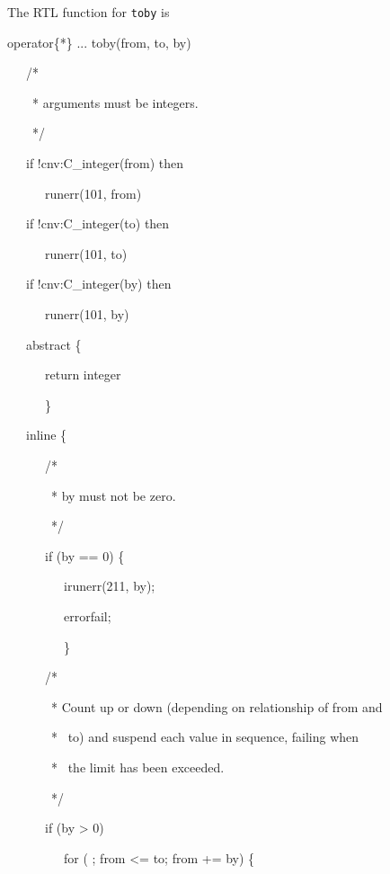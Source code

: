 The RTL function for \texttt{toby} is

{\ttfamily\mdseries
operator\{*\} ... toby(from, to, by)}

{\ttfamily\mdseries
\ \ \ /*}

{\ttfamily\mdseries
\ \ \ \ * arguments must be integers.}

{\ttfamily\mdseries
\ \ \ \ */}

{\ttfamily\mdseries
\ \ \ if !cnv:C\_integer(from) then}

{\ttfamily\mdseries
\ \ \ \ \ \ runerr(101, from)}

{\ttfamily\mdseries
\ \ \ if !cnv:C\_integer(to) then}

{\ttfamily\mdseries
\ \ \ \ \ \ runerr(101, to)}

{\ttfamily\mdseries
\ \ \ if !cnv:C\_integer(by) then}

{\ttfamily\mdseries
\ \ \ \ \ \ runerr(101, by)}

{\ttfamily\mdseries
\ \ \ abstract \{}

{\ttfamily\mdseries
\ \ \ \ \ \ return integer}

{\ttfamily\mdseries
\ \ \ \ \ \ \}}

{\ttfamily\mdseries
\ \ \ inline \{}

{\ttfamily\mdseries
\ \ \ \ \ \ /*}

{\ttfamily\mdseries
\ \ \ \ \ \ \ * by must not be zero.}

{\ttfamily\mdseries
\ \ \ \ \ \ \ */}

{\ttfamily\mdseries
\ \ \ \ \ \ if (by == 0) \{}

{\ttfamily\mdseries
\ \ \ \ \ \ \ \ \ irunerr(211, by);}

{\ttfamily\mdseries
\ \ \ \ \ \ \ \ \ errorfail;}

{\ttfamily\mdseries
\ \ \ \ \ \ \ \ \ \}}

{\ttfamily\mdseries
\ \ \ \ \ \ /*}

{\ttfamily\mdseries
\ \ \ \ \ \ \ * Count up or down (depending on relationship of from and}

{\ttfamily\mdseries
\ \ \ \ \ \ \ * \ to) and suspend each value in sequence, failing when}

{\ttfamily\mdseries
\ \ \ \ \ \ \ * \ the limit has been exceeded.}

{\ttfamily\mdseries
\ \ \ \ \ \ \ */}

{\ttfamily\mdseries
\ \ \ \ \ \ if (by {\textgreater} 0)}

{\ttfamily\mdseries
\ \ \ \ \ \ \ \ \ for ( ; from {\textless}= to; from += by) \{}

